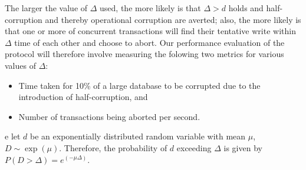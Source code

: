 The larger the value of $\Delta$ used, the more likely is that $\Delta > d$ holds and half-corruption and thereby operational corruption are averted; also, the more likely is that one or more of concurrent transactions will find their tentative write within $\Delta$ time of each other and choose to abort.
Our performance evaluation of the protocol will therefore involve measuring the folowing two metrics for various values of $\Delta$:
\begin{itemize}
\item Time taken for 10\% of a large database to be corrupted due to the introduction of half-corruption, and
\item Number of transactions being aborted per second.
\end{itemize}
e let $d$ be an exponentially distributed random variable with mean $\mu$, $D\sim \exp(\mu)$. Therefore, the probability of $d$ exceeding $\Delta$ is given by $P(D > \Delta) = e^{(-\mu \Delta)}$.







